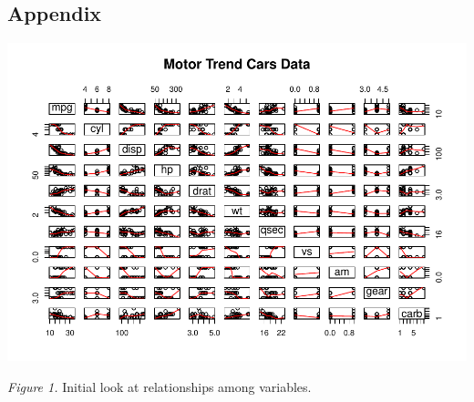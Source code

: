 \documentclass[]{article}
\begin{document}
\pagebreak

\subsection{Appendix}\label{appendix}

\includegraphics{Regression_Models_Course_Project_files/figure-latex/unnamed-chunk-2-1.pdf}

\emph{Figure 1.} Initial look at relationships among variables.
\end{document}
